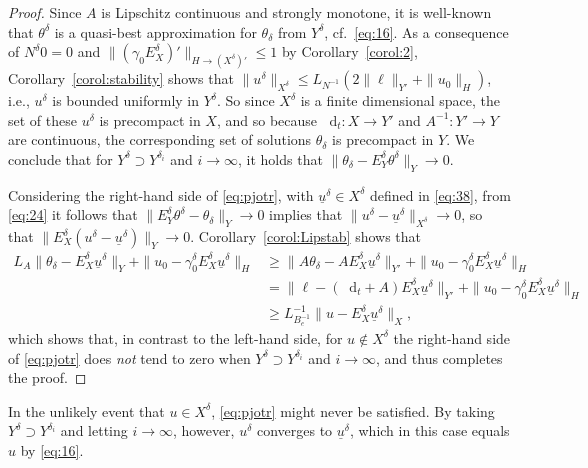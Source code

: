 \documentclass{amsart}
\numberwithin{equation}{section}
\newcommand{\1}{\mathbb 1}
\newcommand*\diff{\mathop{}\!\mathrm{d}}
\begin{document}
\begin{proof}
Since $A$ is Lipschitz continuous and strongly monotone, it is well-known that $\theta^\delta$ is a quasi-best approximation for $\theta_\delta$ from $Y^\delta$, cf.~\eqref{eq:16}.
As a consequence of $N^\delta 0=0$ and $\|(\gamma_0 E_X^\delta)'\|_{H \rightarrow (X^\delta)'} \leq 1$ by Corollary~\ref{corol:2}, Corollary~\ref{corol:stability} shows that $\|u^\delta\|_{X^\delta} \leq L_{N^{-1}}(2 \|\ell\|_{Y'}+\|u_0\|_H)$, i.e., $u^\delta$ is bounded uniformly in $Y^\delta$.
So since $X^\delta$ is a finite dimensional space, the set of these $u^\delta$ is precompact in $X$, and so because $\diff_t\colon X \rightarrow Y'$ and $A^{-1}\colon Y' \rightarrow Y$ are continuous, the corresponding set of solutions $\theta_\delta$ is precompact in $Y$. We conclude that for $Y^\delta  \supset Y^{\delta_i}$ and $i \rightarrow \infty$, it holds that $\|\theta_\delta-E_Y^\delta \theta^\delta\|_Y \rightarrow 0$.

Considering the right-hand side of \eqref{eq:pjotr}, with $\underline{u}^\delta \in X^\delta$ defined in \eqref{eq:38},
from \eqref{eq:24} it follows that $\|E_Y^\delta \theta^\delta - \theta_\delta\|_Y \rightarrow 0$ implies that $\|u^\delta  - \underline{u}^\delta\|_{X^\delta} \rightarrow 0$, so that $\|E_X^\delta(u^\delta  - \underline{u}^\delta)\|_{Y} \rightarrow 0$.
 Corollary~\ref{corol:Lipstab} shows that
\begin{align*}
L_A \|\theta_\delta - E_X^\delta \underline{u}^\delta\|_{Y}+\|u_0 -\gamma^\delta_0 E_X^\delta \underline{u}^\delta\|_H &\geq \|A \theta_\delta - A E_X^\delta \underline{u}^\delta\|_{Y'}+\|u_0 -\gamma^\delta_0 E_X^\delta \underline{u}^\delta\|_H\\
& =  \|\ell - (\diff_t+A) E_X^\delta \underline{u}^\delta\|_{Y'}+\|u_0 -\gamma^\delta_0 E_X^\delta \underline{u}^\delta\|_H\\
&\geq L_{B_e^{-1}}^{-1} \|u-E_X^\delta \underline{u}^\delta\|_X,
\end{align*}
which shows that, in contrast to the left-hand side, for $u \not\in X^\delta$ the right-hand side of \eqref{eq:pjotr} does \emph{not} tend to zero when $Y^\delta  \supset Y^{\delta_i}$ and $i \rightarrow \infty$, and thus completes the proof.
\end{proof}

\begin{remark} In the unlikely event that $u \in X^\delta$, \eqref{eq:pjotr} might never be satisfied. By taking $Y^\delta  \supset Y^{\delta_i}$ and letting $i \rightarrow \infty$, however, $u^\delta$ converges to $ \underline{u}^\delta$, which in this case equals $u$ by \eqref{eq:16}.
\end{remark}
\end{document}

